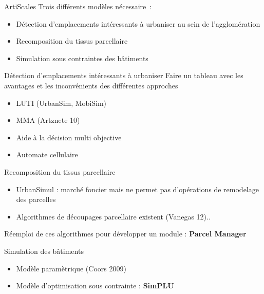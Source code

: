 \documentclass[xcolor=table]{beamer}
\begin{document}
\begin{frame}{ArtiScales}
	Trois différents modèles nécessaire~:
	\begin{itemize}
		\item Détection d'emplacements intéressants à urbaniser au sein de l'agglomération
		\item Recomposition du tissus parcellaire
		\item Simulation sous contraintes des bâtiments
	\end{itemize}
\end{frame}

\begin{frame}{Détection d'emplacements intéressants à urbaniser}
Faire un tableau avec les avantages et les inconvénients des différentes approches
	\begin{itemize}
		\item LUTI (UrbanSim, MobiSim)
		\item MMA (Artznete 10)
		\item Aide à la décision multi objective
		\item Automate cellulaire
	\end{itemize}
\end{frame}

\begin{frame}{Recomposition du tissus parcellaire}
	\begin{itemize}
		\item UrbanSimul : marché foncier mais ne permet pas d'opérations de remodelage des parcelles
		\item Algorithmes de découpages parcellaire	existent (Vanegas 12).. 
	\end{itemize}
	\begin{block}{}
		Réemploi de ces algorithmes pour développer un module : \textbf{Parcel Manager}
	\end{block}
\end{frame}

\begin{frame}{Simulation des bâtiments}
	\begin{itemize}
		\item Modèle paramètrique (Coors 2009)
		\item Modèle d'optimisation sous contrainte	: \textbf{SimPLU}
	\end{itemize}
\end{frame}
\end{document}
